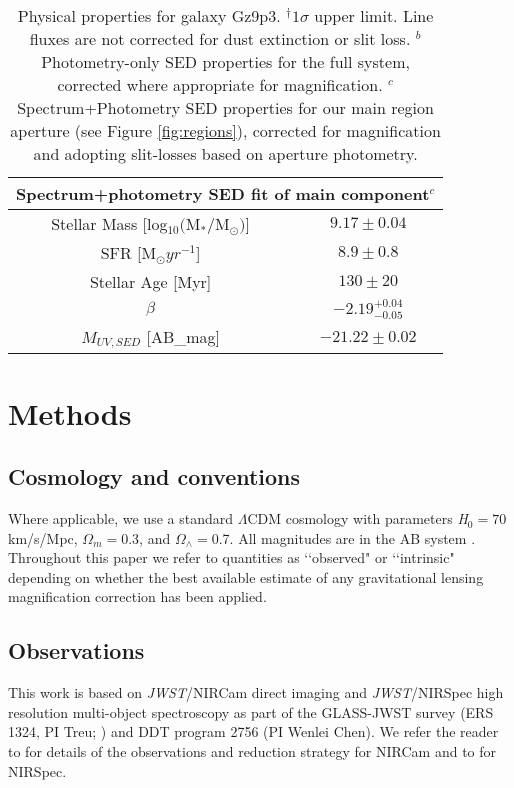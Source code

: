 \documentclass[sn-mathphys]{sn-jnl}%
\theoremstyle{thmstyleone}%
\theoremstyle{thmstyletwo}%
\theoremstyle{thmstylethree}%
\newcommand{\jwst}{\textit{JWST}}
\begin{document}
\begin{table}
\begin{tabular}{cc}
\hline \hline
\multicolumn{2}{c}{Spectrum+photometry SED fit of main component$^c$}\\
\hline
Stellar Mass [log$_{10}($M$_*/$M$_\odot)$]&$9.17\pm0.04$\\
SFR  [M$_\odot yr^{-1}$] & $ 8.9\pm0.8$ \\
Stellar Age  [Myr] &  $130\pm20$\\
$\beta$  & $-2.19^{+0.04}_{-0.05}$ \\
$M_{UV, SED}$ [AB\_mag] & $-21.22\pm0.02$ 
\end{tabular}%
\caption{Physical properties for galaxy Gz9p3. 
$^\dag$$1\sigma$ upper limit. Line fluxes are not corrected for dust extinction or slit loss. 
$^b$ Photometry-only SED properties for the full system,  corrected where appropriate for magnification.
$^c$ Spectrum+Photometry SED properties for our main region aperture (see Figure \ref{fig:regions}), corrected for magnification and adopting slit-losses based on aperture photometry.
}
\label{tab:properties}
\end{table}


\section{Methods} \label{sec:methods}


\subsection{Cosmology and conventions}\label{sec:cosmology}

Where applicable, we use a standard $\Lambda$CDM cosmology with parameters \textit{H}$_{0}=70$ km/s/Mpc, $\Omega_{m}=$0.3, and $\Omega_{\wedge}=$0.7. All magnitudes are in the AB system \citep{Oke83}. Throughout this paper we refer to quantities as \lq\lq observed" or \lq\lq intrinsic" depending on whether the best available estimate of any gravitational lensing magnification correction has been applied. 


\subsection{Observations}\label{sec:obs}

This work is based on \jwst/NIRCam direct imaging and \jwst/NIRSpec high resolution multi-object spectroscopy as part of the GLASS-JWST survey (ERS 1324, PI Treu; \cite{TreuGlass22}) and DDT program 2756 (PI Wenlei Chen).
We refer the reader to \cite{Roberts-Borsani2022, Paris23} for details of the observations and reduction strategy for NIRCam and to \cite{Morishita22} for NIRSpec.
\end{document}
